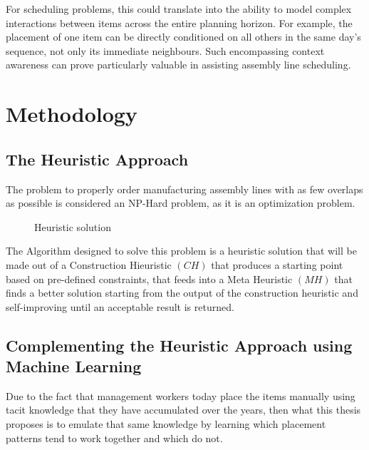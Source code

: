\documentclass[12pt,a4paper]{report}
\begin{document}
For scheduling problems, this could translate into the ability to model complex interactions between items across the entire planning horizon. For example, the placement of one item can be directly conditioned on all others in the same day’s sequence, not only its immediate neighbours. Such encompassing context awareness can prove particularly valuable in assisting assembly line scheduling.


\chapter{Methodology}
\section{The Heuristic Approach}

The problem to properly order manufacturing assembly lines with as few overlaps as possible is considered an NP-Hard problem, as it is an optimization problem.

\begin{figure}[ht]
    \centering

    \caption{Heuristic solution}
    \label{fig:solution}
\end{figure}

The Algorithm designed to solve this problem is a heuristic solution that will be made out of a Construction Hieuristic $(C\!H)$ that produces a starting point based on pre-defined constraints, that feeds into a Meta Heuristic $(M\!H)$ that finds a better solution starting from the output of the construction heuristic and self-improving until an acceptable result is returned. 

\section{Complementing the Heuristic Approach using Machine Learning}
Due to the fact that management workers today place the items manually using tacit knowledge that they have accumulated over the years, then what this thesis proposes is to emulate that same knowledge by learning which placement patterns tend to work together and which do not.
\end{document}
